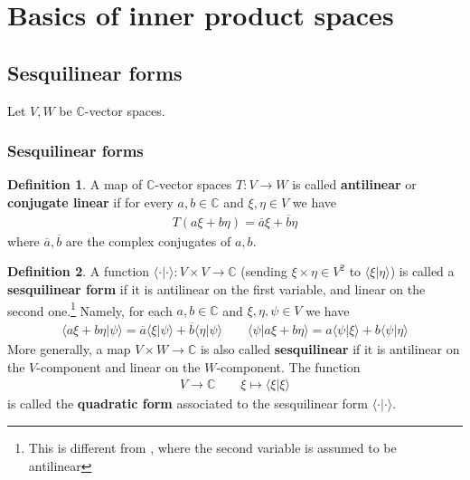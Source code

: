 \documentclass[12pt,b5paper,notitlepage]{article}
\theoremstyle{definition}
\newtheorem{df}{Definition}[subsection]
\theoremstyle{plain}
\newcommand{\ovl}{\overline}
\newcommand{\bk}[1]{\langle {#1}\rangle}
\newcommand{\Cbb}{\mathbb C}
\numberwithin{equation}{section}
\begin{document}
\newpage








\section{Basics of inner product spaces}




\subsection{Sesquilinear forms}



Let $V,W$ be $\Cbb$-vector spaces.



\subsubsection{Sesquilinear forms}



\begin{df}
A map of $\Cbb$-vector spaces $T:V\rightarrow W$ is called \textbf{antilinear} or \textbf{conjugate linear}  if for every $a,b\in\Cbb$ and $\xi,\eta\in V$ we have
\begin{align*}
T(a\xi+b\eta)=\ovl a\xi+\ovl b\eta
\end{align*}
where $\ovl a,\ovl b$ are the complex conjugates of $a,b$.
\end{df}


\begin{df}
A function $\bk{\cdot|\cdot}:V\times V\rightarrow\Cbb$ (sending $\xi\times \eta\in V^2$ to $\bk{\xi|\eta}$) is called a \textbf{sesquilinear form}  if it is antilinear on the first variable, and linear on the second one.\footnote{This is different from \cite{Gui-A}, where the second variable is assumed to be antilinear} Namely, for each $a,b\in\Cbb$ and $\xi,\eta,\psi\in V$ we have
\begin{gather*}
\bk{a\xi+b\eta|\psi}=\ovl a\bk{\xi|\psi}+\ovl b\bk{\eta|\psi}\qquad \bk{\psi|a\xi+b\eta}=a\bk{\psi|\xi}+b\bk{\psi|\eta}
\end{gather*}
More generally, a map $V\times W\rightarrow\Cbb$ is also called \textbf{sesquilinear} if it is antilinear on the $V$-component and linear on the $W$-component. The function
\begin{align*}
V\rightarrow\Cbb\qquad \xi\mapsto\bk{\xi|\xi}
\end{align*}
is called the \textbf{quadratic form}  associated to the sesquilinear form $\bk{\cdot|\cdot}$.
\end{df}
\end{document}
